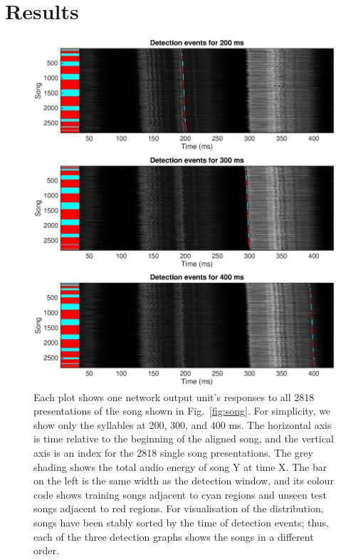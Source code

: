 \documentclass[10pt,letterpaper]{article}
\newcommand\fig[1]{Fig.~\ref{#1}}
\begin{document}
\section{Results}
\label{sec:results}

\begin{figure}
  \includegraphics[width=\textwidth]{detection_raster}
  \caption{Each plot shows one network output unit's responses to all
    2818 presentations of the song shown in \fig{fig:song}.  For
    simplicity, we show only the syllables at 200, 300, and 400 ms. The
    horizontal axis is time relative to the beginning of the aligned
    song, and the vertical axis is an index for the 2818 single song
    presentations. The grey shading shows the total audio energy of
    song Y at time X. The bar on the left is the same width as the
    detection window, and its colour code shows training songs
    adjacent to cyan regions and unseen test songs adjacent to red
    regions. For visualisation of the distribution, songs have been
    stably sorted by the time of detection events; thus, each of the
    three detection graphs shows the songs in a different order.}
  \label{fig:detection_raster}
\end{figure}
\end{document}
